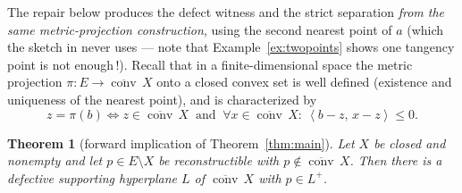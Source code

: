 \documentclass[11pt]{article}
\newtheorem{theorem}{Theorem}[section]
\theoremstyle{remark}
\newcommand{\X}{X}
\newcommand{\conv}{\operatorname{conv}}
\newcommand{\cconv}[1]{\overline{\conv}\,#1}
\newcommand{\sca}[2]{\left\langle #1,\, #2\right\rangle}
\begin{document}
The repair below produces the defect witness and the strict separation \emph{from the same
metric-projection construction}, using the second nearest point of $a$ (which the sketch in
\cite{Bia} never uses --- note that Example~\ref{ex:twopoints} shows one tangency point is not
enough\,!). Recall that in a finite-dimensional space the metric projection
$\pi:E\to\cconv \X$ onto a closed convex set is well defined (existence and uniqueness of the
nearest point), and is characterized by
\begin{equation}\label{eq:projchar}
 z=\pi(b)\iff z\in\cconv\X\ \text{ and }\ \forall x\in\cconv \X:\ \sca{b-z}{x-z}\le0 .
\end{equation}

\begin{theorem}[forward implication of Theorem~\ref{thm:main}]
Let $\X$ be closed and nonempty and let $p\in E\setminus\X$ be reconstructible with
$p\notin\cconv \X$. Then there is a defective supporting hyperplane $L$ of $\cconv\X$ with
$p\in L^{+}$.
\end{theorem}
\end{document}
